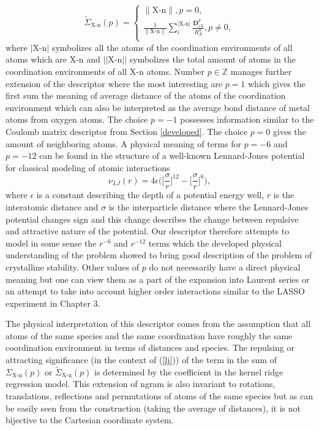 \documentclass[11pt,oneside,czech,american]{book} %
\theoremstyle{plain}
\theoremstyle{definition}
\begin{document}
\begin{equation}
	\tilde{\Sigma}_{\text{X-n}}(p) =
	\begin{cases}
		\|\text{X-n}\|, p=0, \\
		\frac{1}{\|\text{X-n}\|}\sum_{i}^{|\text{X-n}|} \frac{\bm{D}_{iX}^p}{R^S_X}, p \neq 0, \\
		
	\end{cases}
	\label{proposed}
\end{equation}
where $|\text{X-n}|$ symbolizes all the atoms of the coordination environments of all atoms which are X-n and $||\text{X-n}||$ symbolizes the total amount of atoms in the coordination environments of all X-n atoms. Number $p \in \mathbb{Z}$ manages further extension of the descriptor where the most interesting are $p=1$ which gives the first sum the meaning of average distance of the atoms of the coordination environment which can also be interpreted as the average bond distance of metal atoms from oxygen atoms. The choice $p=-1$ possesses information similar to the Coulomb matrix descriptor from Section \ref{developed}. The choice $p = 0$ gives the amount of neighboring atoms. A physical meaning of terms for $p=-6$ and $p=-12$ can be found in the structure of a well-known Lennard-Jones potential for classical modeling of atomic interactions \parencite{wang20}
\begin{equation}
	\nu_{LJ}(r) = 4\epsilon \Bigg( \Big[ \frac{\sigma}{r} \Big]^{12} - \Big[ \frac{\sigma}{r} \Big]^6 \Bigg),
	\label{lj}
\end{equation}
where $\epsilon$ is a constant describing the depth of a potential energy well, $r$ is the interatomic distance and $\sigma$ is the interparticle distance where the Lennard-Jones potential changes sign and this change describes the change between repulsive and attractive nature of the potential. Our descriptor therefore attempts to model in some sense the $r^{-6}$ and $r^{-12}$ terms which the developed physical understanding of the problem showed to bring good description of the problem of crystalline stability.
 Other values of $p$ do not necessarily have a direct physical meaning but one can view them as a part of the expansion into Laurent series or an attempt to take into account higher order interactions similar to the LASSO experiment in Chapter 3.

The physical interpretation of this descriptor comes from the assumption that all atoms of the same species and the same coordination have roughly the same coordination environment in terms of distances and species. The repulsing or attracting significance (in the context of (\ref{lj})) of the term in the sum of $\Sigma_{\text{X-n}}(p)$ or $\tilde{\Sigma}_{\text{X-n}}(p)$ is determined by the coefficient in the kernel ridge regression model. This extension of ngram is also invariant to rotations, translations, reflections and permutations of atoms of the same species but as can be easily seen from the construction (taking the average of distances), it is not bijective to the Cartesian coordinate system.
\end{document}
